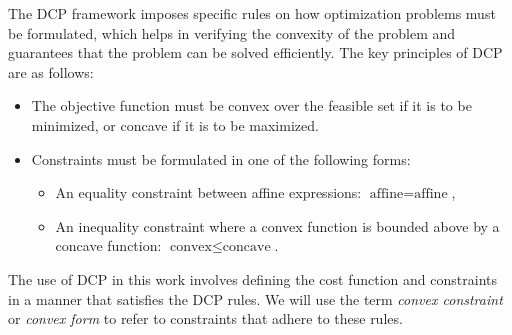 The DCP framework imposes specific rules on how optimization problems must be formulated, which helps in verifying the convexity of the problem and
guarantees that the problem can be solved efficiently.
The key principles of DCP are as follows:
\begin{itemize}
	\item The objective function must be convex over the feasible set if it is to be minimized, or concave if it is to
	      be maximized.
	\item Constraints must be formulated in one of the following forms:
	      \begin{itemize}
		      \item An equality constraint between affine expressions: \(\text{affine} = \text{affine}\),
		      \item An inequality constraint where a convex function is bounded above by a concave function: \(\text{convex} \leq \text{concave}\).
	      \end{itemize}
\end{itemize}
The use of DCP in this work involves defining the cost function and constraints in a manner that satisfies the DCP rules.
We will use the term \textit{convex constraint} or \textit{convex form} to refer to constraints that adhere to these rules.
